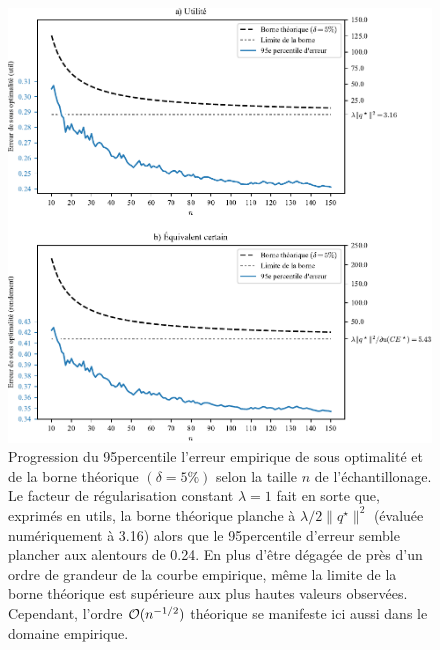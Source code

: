 \begin{figure}[h!]
  \centering
  \includegraphics[width=1.3\textwidth]{../experiments/fig/bound_errso.pdf}
  \caption[Erreur de sous optimalité en fonction de $n$ ($\lambda$
  constant)]{Progression du 95\ieme percentile l'erreur empirique de sous optimalité et de
    la borne théorique $(\delta = 5\%)$ selon la taille $n$ de l'échantillonage. Le facteur de
    régularisation constant $\lambda = 1$ fait en sorte que, exprimés en utils, la borne
    théorique planche à $\lambda/2\|q^\star\|^2$ (évaluée numériquement à \num{3.16}) alors que le
    95\ieme percentile d'erreur semble plancher aux alentours de \num{0.24}. En plus
    d'être dégagée de près d'un ordre de grandeur de la courbe empirique, même la limite
    de la borne théorique est supérieure aux plus hautes valeurs observées. Cependant,
    l'ordre $\mathcal O(n^{-1/2})$ théorique se manifeste ici aussi dans le domaine empirique.}
  \label{fig_bound_errso}
\end{figure}

